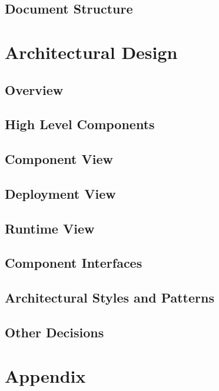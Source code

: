 \documentclass[a4paper,12pt]{report}
\begin{document}
\section{Document Structure}


\chapter{Architectural Design}
\label{ch:Arch_Design}

\section{Overview}


\newpage
\section{High Level Components}\label{high_level_comps}


\section{Component View}\label{component_view}


\section{Deployment View}\label{deployment_view}


\section{Runtime View}\label{runtime_view}


\section{Component Interfaces}\label{component_if}


\section{Architectural Styles and Patterns}\label{sel_arch_styles_patterns}


\section{Other Decisions}\label{other_decisions}


\appendix
\chapter{Appendix}



\end{document}
